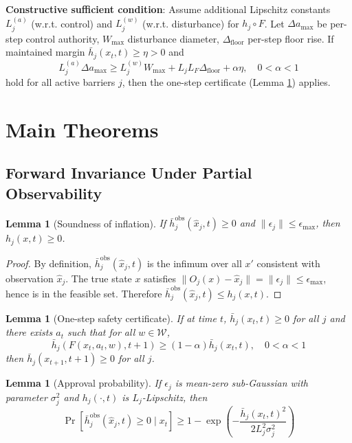 \documentclass[11pt,a4paper]{article}
\newtheorem{lemma}[theorem]{Lemma}
\theoremstyle{definition}
\newcommand{\W}{\mathcal{W}}
\begin{document}
\textbf{Constructive sufficient condition}: Assume additional Lipschitz constants $L_j^{(a)}$ (w.r.t. control) and $L_j^{(w)}$ (w.r.t. disturbance) for $h_j \circ F$. Let $\Delta a_{\max}$ be per-step control authority, $W_{\max}$ disturbance diameter, $\Delta_{\text{floor}}$ per-step floor rise. If maintained margin $\bar{h}_j(x_t, t) \geq \eta > 0$ and
\begin{equation}\label{eq:sufficient}
L_j^{(a)} \Delta a_{\max} \geq L_j^{(w)} W_{\max} + L_j L_F \Delta_{\text{floor}} + \alpha\eta, \quad 0 < \alpha < 1
\end{equation}
hold for all active barriers $j$, then the one-step certificate (Lemma \ref{lem:onestep}) applies.

\section{Main Theorems}

\subsection{Forward Invariance Under Partial Observability}

\begin{lemma}[Soundness of inflation]\label{lem:soundness}
If $\bar{h}_j^{\text{obs}}(\hat{x}_j, t) \geq 0$ and $\|\epsilon_j\| \leq \epsilon_{\max}$, then $h_j(x, t) \geq 0$.
\end{lemma}

\begin{proof}
By definition, $\bar{h}_j^{\text{obs}}(\hat{x}_j, t)$ is the infimum over all $x'$ consistent with observation $\hat{x}_j$. The true state $x$ satisfies $\|O_j(x) - \hat{x}_j\| = \|\epsilon_j\| \leq \epsilon_{\max}$, hence is in the feasible set. Therefore $\bar{h}_j^{\text{obs}}(\hat{x}_j, t) \leq h_j(x, t)$.
\end{proof}

\begin{lemma}[One-step safety certificate]\label{lem:onestep}
If at time $t$, $\bar{h}_j(x_t, t) \geq 0$ for all $j$ and there exists $a_t$ such that for all $w \in \W$,
\begin{equation}
\bar{h}_j(F(x_t, a_t, w), t+1) \geq (1 - \alpha)\bar{h}_j(x_t, t), \quad 0 < \alpha < 1
\end{equation}
then $\bar{h}_j(x_{t+1}, t+1) \geq 0$ for all $j$.
\end{lemma}

\begin{lemma}[Approval probability]\label{lem:approval}
If $\epsilon_j$ is mean-zero sub-Gaussian with parameter $\sigma_j^2$ and $h_j(\cdot, t)$ is $L_j$-Lipschitz, then
\begin{equation}
\Pr[\bar{h}_j^{\text{obs}}(\hat{x}_j, t) \geq 0 \mid x_t] \geq 1 - \exp\left(-\frac{\bar{h}_j(x_t, t)^2}{2L_j^2 \sigma_j^2}\right)
\end{equation}
\end{lemma}
\end{document}
